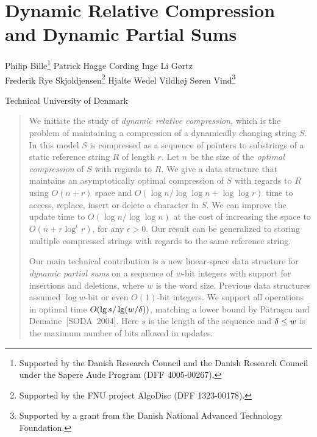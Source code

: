 \chapter{Dynamic Relative Compression and Dynamic Partial Sums}\label{chp:dynamiccompression}

\begin{infosection}
    \begin{authors}
        Philip Bille\footnote{Supported by the Danish Research Council and the Danish Research Council under the Sapere Aude Program (DFF 4005-00267).} \qquad Patrick Hagge Cording \qquad Inge Li G{\o}rtz\samethanks \\
        Frederik Rye Skjoldjensen\footnote{Supported by the FNU project AlgoDisc (DFF 1323-00178).} \qquad Hjalte Wedel Vildh{\o}j \qquad S{\o}ren Vind\footnote{Supported by a grant from the Danish National Advanced Technology Foundation.}
    \end{authors}

    \begin{uninames}
        Technical University of Denmark
    \end{uninames}

    \begin{abstract}
We initiate the study of \emph{dynamic relative compression}, which is the problem of maintaining a compression of a dynamically changing string $S$. In this model $S$ is compressed as a sequence of pointers to substrings of a static reference string $R$ of length $r$. Let $n$ be the size of the \emph{optimal compression} of $S$ with regards to $R$.
%
We give a data structure that maintains an asymptotically optimal compression of $S$ with regards to $R$ using $O(n+r)$ space and $O(\log n / \log \log n + \log\log r)$ time to access, replace, insert or delete a character in $S$. We can improve the update time to $O(\log n / \log \log n)$ at the cost of increasing the space to $O(n+r\log^\epsilon r)$, for any $\epsilon > 0$. Our result can be generalized to storing multiple compressed strings with regards to the same reference string.


Our main technical contribution is a new linear-space data structure for \emph{dynamic partial sums} on a sequence of $w$-bit integers with support for insertions and deletions, where $w$ is the word size. 
Previous data structures assumed $\log w$-bit or even $O(1)$-bit integers.
%
We support all operations in optimal time $O(\lg s / \lg (w/\delta))$, matching a lower bound by Pătraşcu and Demaine~[SODA~2004]. Here $s$ is the length of the sequence and $\delta \leq w$ is the maximum number of bits allowed in updates.
    \end{abstract}
\end{infosection}

